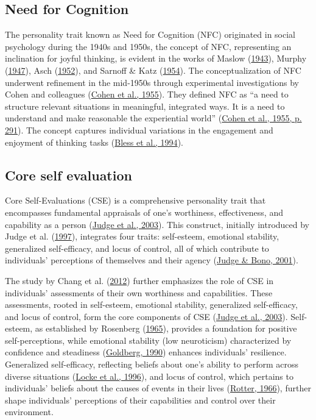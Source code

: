 \documentclass[
  12pt,
  a4paper,
  twoside]{article}
\begin{document}
\hypertarget{need-for-cognition}{%
\subsection{Need for Cognition}\label{need-for-cognition}}

The personality trait known as Need for Cognition (NFC) originated in social psychology during the 1940s and 1950s, the concept of NFC, representing an inclination for joyful thinking, is evident in the works of Maslow (\protect\hyperlink{ref-maslow1943}{1943}), Murphy (\protect\hyperlink{ref-murphy1947}{1947}), Asch (\protect\hyperlink{ref-asch1952}{1952}), and Sarnoff \& Katz (\protect\hyperlink{ref-sarnoff1954}{1954}). The conceptualization of NFC underwent refinement in the mid-1950s through experimental investigations by Cohen and colleagues (\protect\hyperlink{ref-cohen1955}{Cohen et al., 1955}). They defined NFC as ``a need to structure relevant situations in meaningful, integrated ways. It is a need to understand and make reasonable the experiential world'' (\protect\hyperlink{ref-cohen1955}{Cohen et al., 1955, p. 291}). The concept captures individual variations in the engagement and enjoyment of thinking tasks (\protect\hyperlink{ref-bless1994}{Bless et al., 1994}).

\hypertarget{core-self-evaluation}{%
\subsection{Core self evaluation}\label{core-self-evaluation}}

Core Self-Evaluations (CSE) is a comprehensive personality trait that encompasses fundamental appraisals of one's worthiness, effectiveness, and capability as a person (\protect\hyperlink{ref-judge2003}{Judge et al., 2003}). This construct, initially introduced by Judge et al. (\protect\hyperlink{ref-judge1997}{1997}), integrates four traits: self-esteem, emotional stability, generalized self-efficacy, and locus of control, all of which contribute to individuals' perceptions of themselves and their agency (\protect\hyperlink{ref-judge2001}{Judge \& Bono, 2001}).

The study by Chang et al. (\protect\hyperlink{ref-chang2012}{2012}) further emphasizes the role of CSE in individuals' assessments of their own worthiness and capabilities. These assessments, rooted in self-esteem, emotional stability, generalized self-efficacy, and locus of control, form the core components of CSE (\protect\hyperlink{ref-judge2003}{Judge et al., 2003}). Self-esteem, as established by Rosenberg (\protect\hyperlink{ref-rosenberg1965}{1965}), provides a foundation for positive self-perceptions, while emotional stability (low neuroticism) characterized by confidence and steadiness (\protect\hyperlink{ref-goldberg1990}{Goldberg, 1990}) enhances individuals' resilience. Generalized self-efficacy, reflecting beliefs about one's ability to perform across diverse situations (\protect\hyperlink{ref-locke1996}{Locke et al., 1996}), and locus of control, which pertains to individuals' beliefs about the causes of events in their lives (\protect\hyperlink{ref-rotter1966}{Rotter, 1966}), further shape individuals' perceptions of their capabilities and control over their environment.
\end{document}
